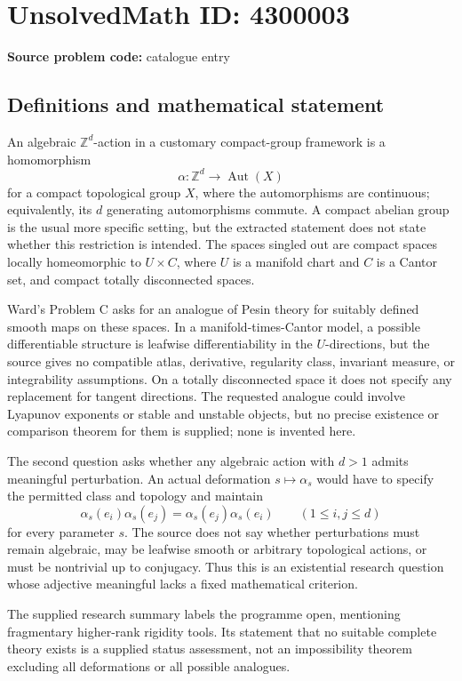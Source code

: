 \documentclass[11pt]{article}
\newcommand{\Z}{\mathbb{Z}}
\begin{document}
\section*{UnsolvedMath ID: 4300003}
\textbf{Source problem code:} catalogue entry
\subsection{Definitions and mathematical statement}
An algebraic \(\Z^d\)-action in a customary compact-group framework is a homomorphism
\[
\alpha:\Z^d\longrightarrow\operatorname{Aut}(X)
\]
for a compact topological group \(X\), where the automorphisms are continuous; equivalently, its \(d\) generating automorphisms commute. A compact abelian group is the usual more specific setting, but the extracted statement does not state whether this restriction is intended. The spaces singled out are compact spaces locally homeomorphic to \(U\times C\), where \(U\) is a manifold chart and \(C\) is a Cantor set, and compact totally disconnected spaces.

Ward's Problem C asks for an analogue of Pesin theory for suitably defined smooth maps on these spaces. In a manifold-times-Cantor model, a possible differentiable structure is leafwise differentiability in the \(U\)-directions, but the source gives no compatible atlas, derivative, regularity class, invariant measure, or integrability assumptions. On a totally disconnected space it does not specify any replacement for tangent directions. The requested analogue could involve Lyapunov exponents or stable and unstable objects, but no precise existence or comparison theorem for them is supplied; none is invented here.

The second question asks whether any algebraic action with \(d>1\) admits meaningful perturbation. An actual deformation \(s\mapsto\alpha_s\) would have to specify the permitted class and topology and maintain
\[
\alpha_s(e_i)\alpha_s(e_j)=\alpha_s(e_j)\alpha_s(e_i)
\qquad(1\le i,j\le d)
\]
for every parameter \(s\). The source does not say whether perturbations must remain algebraic, may be leafwise smooth or arbitrary topological actions, or must be nontrivial up to conjugacy. Thus this is an existential research question whose adjective meaningful lacks a fixed mathematical criterion.

The supplied research summary labels the programme open, mentioning fragmentary higher-rank rigidity tools. Its statement that no suitable complete theory exists is a supplied status assessment, not an impossibility theorem excluding all deformations or all possible analogues.
\end{document}
